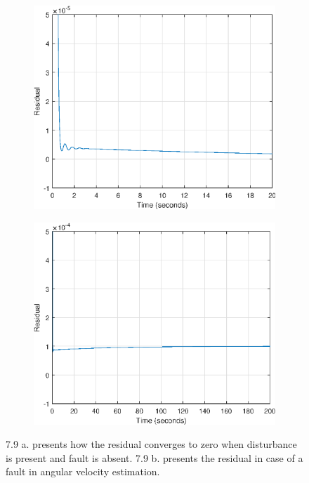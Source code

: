 \begin{figure}[H]
	\begin{subfigure}{0.5\linewidth}
			\centering
		\includegraphics[width=1\linewidth]{figures/nosensfault_res}
		\label{fig:nosensfault_res}		
		\caption{}
	\end{subfigure}
		\begin{subfigure}{0.5\linewidth}
	\centering
\includegraphics[width=1\linewidth]{figures/sensfault_res}
\label{fig:sensfault_res}	
\caption{}
	\end{subfigure}
\caption{7.9 a. presents how the residual converges to zero when disturbance is present and fault is absent. 7.9 b. presents the residual in case of a fault in angular velocity estimation.}
\end{figure}

